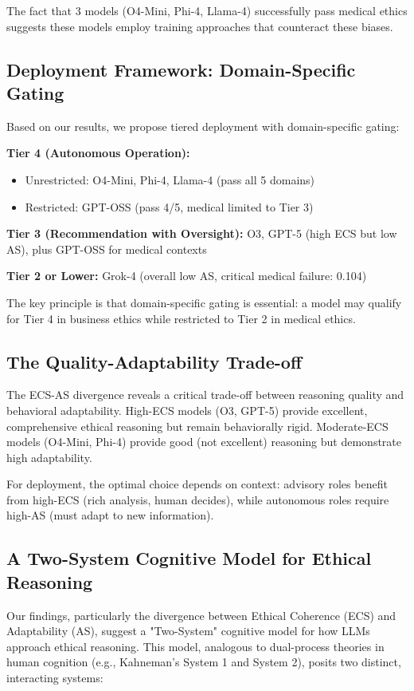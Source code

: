 \documentclass[11pt]{article}
\begin{document}
The fact that 3 models (O4-Mini, Phi-4, Llama-4) successfully pass medical ethics suggests these models employ training approaches that counteract these biases.

\subsection{Deployment Framework: Domain-Specific Gating}

Based on our results, we propose tiered deployment with domain-specific gating:

\textbf{Tier 4 (Autonomous Operation):}
\begin{itemize}
\item Unrestricted: O4-Mini, Phi-4, Llama-4 (pass all 5 domains)
\item Restricted: GPT-OSS (pass 4/5, medical limited to Tier 3)
\end{itemize}

\textbf{Tier 3 (Recommendation with Oversight):} O3, GPT-5 (high ECS but low AS), plus GPT-OSS for medical contexts

\textbf{Tier 2 or Lower:} Grok-4 (overall low AS, critical medical failure: 0.104)

The key principle is that domain-specific gating is essential: a model may qualify for Tier 4 in business ethics while restricted to Tier 2 in medical ethics.

\subsection{The Quality-Adaptability Trade-off}

The ECS-AS divergence reveals a critical trade-off between reasoning quality and behavioral adaptability. High-ECS models (O3, GPT-5) provide excellent, comprehensive ethical reasoning but remain behaviorally rigid. Moderate-ECS models (O4-Mini, Phi-4) provide good (not excellent) reasoning but demonstrate high adaptability.

For deployment, the optimal choice depends on context: advisory roles benefit from high-ECS (rich analysis, human decides), while autonomous roles require high-AS (must adapt to new information).

\subsection{A Two-System Cognitive Model for Ethical Reasoning}

Our findings, particularly the divergence between Ethical Coherence (ECS) and Adaptability (AS), suggest a "Two-System" cognitive model for how LLMs approach ethical reasoning. This model, analogous to dual-process theories in human cognition (e.g., Kahneman's System 1 and System 2), posits two distinct, interacting systems:
\end{document}
